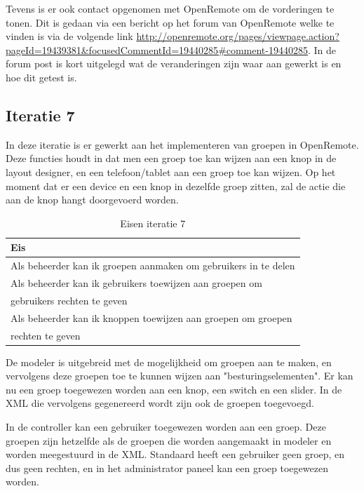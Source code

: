\documentclass[]{article}
\begin{document}
Tevens is er ook contact opgenomen met OpenRemote om de vorderingen te tonen.
Dit is gedaan via een bericht op het forum van OpenRemote welke te vinden is via
de volgende link 
\url{http://openremote.org/pages/viewpage.action?pageId=19439381&focusedCommentId=19440285#comment-19440285}. 
In de forum post is kort uitgelegd wat de veranderingen zijn waar aan gewerkt is en hoe dit getest is. 
 
\subsection{Iteratie 7}

In deze iteratie is er gewerkt aan het implementeren van groepen in OpenRemote.
Deze functies houdt in dat men een groep toe kan wijzen aan een knop in de layout
designer, en een telefoon/tablet aan een groep toe kan wijzen. Op het moment dat er
een device en een knop in dezelfde groep zitten, zal de actie die aan de knop
hangt doorgevoerd worden.

\begin{table}[htpb]
  \caption{Eisen iteratie 7}
  \begin{center}
    \begin{tabular}{|| l ||}\hline
        Eis                                                              \\\hline\hline
        Als beheerder kan ik groepen aanmaken om gebruikers in te delen  \\\hline
        Als beheerder kan ik gebruikers toewijzen aan groepen om         \\ 
        gebruikers rechten te geven                                      \\\hline
        Als beheerder kan ik knoppen toewijzen aan groepen om groepen    \\ 
        rechten te geven                                                 \\\hline
    \end{tabular}
  \end{center}
\end{table}

De modeler is uitgebreid met de mogelijkheid om groepen aan te maken, en
vervolgens deze groepen toe te kunnen wijzen aan "besturingselementen". Er kan
nu een groep toegewezen worden aan een knop, een switch en een slider. In de XML
die vervolgens gegenereerd wordt zijn ook de groepen toegevoegd. 

In de controller kan een gebruiker toegewezen worden aan een groep. Deze groepen
zijn hetzelfde als de groepen die worden aangemaakt in modeler en worden
meegestuurd in de XML. Standaard heeft een gebruiker geen groep, en dus geen
rechten, en in het administrator paneel kan een groep toegewezen worden.
\end{document}
